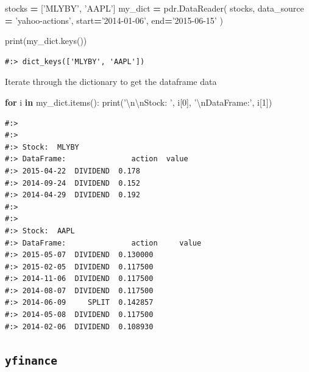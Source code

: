 \documentclass[
]{book}
\newenvironment{Shaded}{\begin{snugshade}}{\end{snugshade}}
\newcommand{\BuiltInTok}[1]{#1}
\newcommand{\CharTok}[1]{\textcolor[rgb]{0.5,0.5,0.5}{#1}}
\newcommand{\ControlFlowTok}[1]{\textcolor[rgb]{0.27,0.27,0.27}{\textbf{#1}}}
\newcommand{\DecValTok}[1]{\textcolor[rgb]{0.06,0.06,0.06}{#1}}
\newcommand{\KeywordTok}[1]{\textcolor[rgb]{0.27,0.27,0.27}{\textbf{#1}}}
\newcommand{\NormalTok}[1]{#1}
\newcommand{\OperatorTok}[1]{\textcolor[rgb]{0.43,0.43,0.43}{\textbf{#1}}}
\newcommand{\StringTok}[1]{\textcolor[rgb]{0.5,0.5,0.5}{#1}}
\begin{document}
\begin{Shaded}
\begin{Highlighting}[]
\NormalTok{stocks }\OperatorTok{=}\NormalTok{ [}\StringTok{'MLYBY'}\NormalTok{, }\StringTok{'AAPL'}\NormalTok{]}
\NormalTok{my_dict }\OperatorTok{=}\NormalTok{ pdr.DataReader( stocks,}
\NormalTok{  data_source }\OperatorTok{=} \StringTok{'yahoo-actions'}\NormalTok{,}
\NormalTok{  start}\OperatorTok{=}\StringTok{'2014-01-06'}\NormalTok{, }
\NormalTok{  end}\OperatorTok{=}\StringTok{'2015-06-15'}
\NormalTok{)}

\BuiltInTok{print}\NormalTok{(my_dict.keys())}
\end{Highlighting}
\end{Shaded}

\begin{verbatim}
#:> dict_keys(['MLYBY', 'AAPL'])
\end{verbatim}

Iterate through the dictionary to get the dataframe data

\begin{Shaded}
\begin{Highlighting}[]
\ControlFlowTok{for}\NormalTok{ i }\KeywordTok{in}\NormalTok{ my_dict.items():}
  \BuiltInTok{print}\NormalTok{(}\StringTok{'}\CharTok{\textbackslash{}n\textbackslash{}n}\StringTok{Stock: '}\NormalTok{, i[}\DecValTok{0}\NormalTok{],}
        \StringTok{'}\CharTok{\textbackslash{}n}\StringTok{DataFrame:'}\NormalTok{, i[}\DecValTok{1}\NormalTok{])}
\end{Highlighting}
\end{Shaded}

\begin{verbatim}
#:> 
#:> 
#:> Stock:  MLYBY 
#:> DataFrame:               action  value
#:> 2015-04-22  DIVIDEND  0.178
#:> 2014-09-24  DIVIDEND  0.152
#:> 2014-04-29  DIVIDEND  0.192
#:> 
#:> 
#:> Stock:  AAPL 
#:> DataFrame:               action     value
#:> 2015-05-07  DIVIDEND  0.130000
#:> 2015-02-05  DIVIDEND  0.117500
#:> 2014-11-06  DIVIDEND  0.117500
#:> 2014-08-07  DIVIDEND  0.117500
#:> 2014-06-09     SPLIT  0.142857
#:> 2014-05-08  DIVIDEND  0.117500
#:> 2014-02-06  DIVIDEND  0.108930
\end{verbatim}

\hypertarget{yfinance}{%
\subsection{\texorpdfstring{\texttt{yfinance}}{yfinance}}\label{yfinance}}
\end{document}
